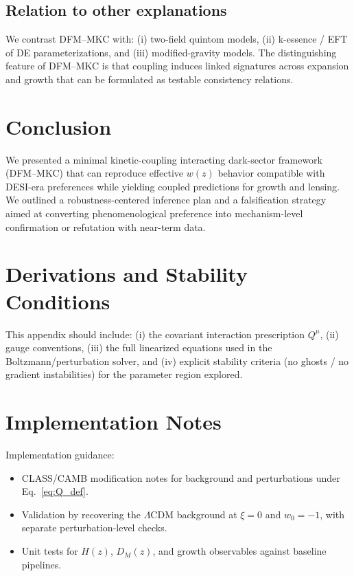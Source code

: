 \documentclass[reprint,aps,prd,nofootinbib,superscriptaddress]{revtex4-2}
\newcommand{\LCDM}{\ensuremath{\Lambda\mathrm{CDM}}\xspace}
\newcommand{\wz}{\ensuremath{w(z)}\xspace}
\begin{document}
\subsection{Relation to other explanations}

We contrast DFM--MKC with:
(i) two-field quintom models, (ii) k-essence / EFT of DE parameterizations, and (iii) modified-gravity models.
The distinguishing feature of DFM--MKC is that coupling induces linked signatures across expansion and growth that can be formulated as testable consistency relations.

\section{Conclusion}
\label{sec:conclusion}

We presented a minimal kinetic-coupling interacting dark-sector framework (DFM--MKC) that can reproduce effective \wz behavior compatible with DESI-era preferences while yielding coupled predictions for growth and lensing.
We outlined a robustness-centered inference plan and a falsification strategy aimed at converting phenomenological preference into mechanism-level confirmation or refutation with near-term data.

\appendix

\section{Derivations and Stability Conditions}
\label{app:stability}

This appendix should include:
(i) the covariant interaction prescription $Q^\mu$, (ii) gauge conventions, (iii) the full linearized equations used in the Boltzmann/perturbation solver,
and (iv) explicit stability criteria (no ghosts / no gradient instabilities) for the parameter region explored.

\section{Implementation Notes}
\label{app:implementation}

Implementation guidance:
\begin{itemize}
\item CLASS/CAMB modification notes for background and perturbations under Eq.~\eqref{eq:Q_def}.
\item Validation by recovering the \LCDM background at $\xi=0$ and $w_0=-1$, with separate perturbation-level checks.
\item Unit tests for $H(z)$, $D_M(z)$, and growth observables against baseline pipelines.
\end{itemize}



\end{document}
